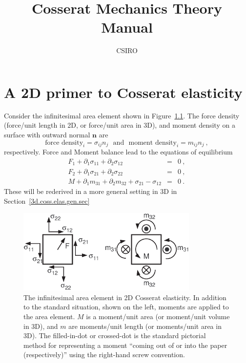 \documentclass[]{scrreprt}
\newcommand{\si}{\sigma}
\newcommand{\mand}{\ \ \ \mbox{and}\ \ \ }
\newcommand{\pl}{\partial}
\begin{document}
\title{Cosserat Mechanics Theory Manual}
\author{CSIRO}
\maketitle

\tableofcontents

\chapter{A 2D primer to Cosserat elasticity}

Consider the infinitesimal area element shown in
Figure~\ref{inf_cosserat.fig}.  The force density (force/unit length
in 2D, or force/unit area in 3D), and moment density on a surface with
outward normal ${\mathbf n}$ are
$$
\mbox{force density}_{i} = \si_{ij}n_{j} \mand
\mbox{moment density}_{i} = m_{ij}n_{j} \ ,
$$
respectively.  Force and Moment balance lead to the
equations of equilibrium
\begin{eqnarray*}
F_{1} + \pl_{1}\si_{11} + \pl_{2}\si_{12} & = & 0 \ ,\\
F_{2} + \pl_{1}\si_{21} + \pl_{2}\si_{22} & = & 0 \ ,\\
M + \pl_{1}m_{31} + \pl_{2}m_{32} + \si_{21}-\si_{12} & = & 0 \ .
\end{eqnarray*}
These will be rederived in a more general setting in 3D in Section~\ref{3d.coss.elas.gen.sec}

\begin{figure}[htb]
\begin{center}
\includegraphics[width=0.8\textwidth]{inf_cosserat.eps}
\caption{The infinitesimal area element in 2D Cosserat elasticity.
  In addition to the standard situation, shown on the left, moments
  are applied to the area element.  $M$ is a moment/unit area (or
  moment/unit volume in 3D), and $m$ are moments/unit length (or
  moments/unit area in 3D).  The filled-in-dot or crossed-dot
  is the standard pictorial method for representing a moment ``coming
  out of or into the paper (respectively)'' using the right-hand screw
  convention.}
\label{inf_cosserat.fig}
\end{center}
\end{figure}
\end{document}
